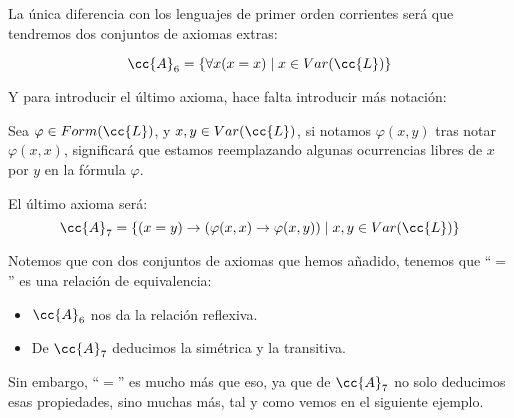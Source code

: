 La única diferencia con los lenguajes de primer orden corrientes será que tendremos dos conjuntos de axiomas extras:

\begin{equation*}
    \cc{A}_6 = \{\forall x(x=x) \mid x\in Var(\cc{L})\}
\end{equation*}

Y para introducir el último axioma, hace falta introducir más notación:
\begin{notacion}
    Sea $\varphi \in Form(\cc{L})$, y $x,y\in Var(\cc{L})$, si notamos $\varphi(x,y)$ tras notar $\varphi(x,x)$, significará que estamos reemplazando algunas ocurrencias libres de $x$ por $y$ en la fórmula $\varphi$.
\end{notacion}
El último axioma será:
\begin{equation*}
    \cc{A}_7 = \{(x=y)\to (\varphi(x,x)\to \varphi(x,y))\mid x,y\in Var(\cc{L})\}
\end{equation*}

\begin{observacion}
    Notemos que con dos conjuntos de axiomas que hemos añadido, tenemos que ``$=$'' es una relación de equivalencia:
    \begin{itemize}
        \item $\cc{A}_6$ nos da la relación reflexiva.
        \item De $\cc{A}_7$ deducimos la simétrica y la transitiva.
    \end{itemize}
    Sin embargo, ``$=$'' es mucho más que eso, ya que de $\cc{A}_7$ no solo deducimos esas propiedades, sino muchas más, tal y como vemos en el siguiente ejemplo.
\end{observacion}

